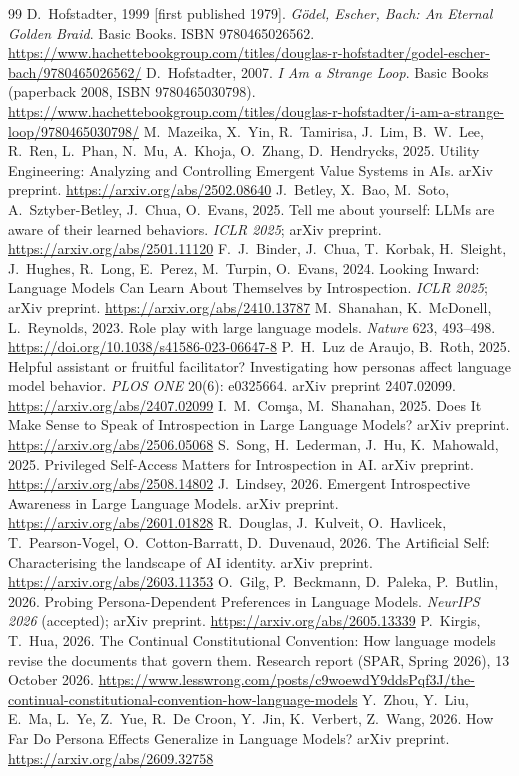\documentclass[11pt]{article}
\begin{document}
\begin{thebibliography}{99}\small
{} D.~Hofstadter, 1999 [first published 1979]. \emph{G\"odel,
Escher, Bach: An Eternal Golden Braid}. Basic Books. ISBN 9780465026562.
\url{https://www.hachettebookgroup.com/titles/douglas-r-hofstadter/godel-escher-bach/9780465026562/}
 D.~Hofstadter, 2007. \emph{I Am a Strange Loop}.
Basic Books (paperback 2008, ISBN 9780465030798).
\url{https://www.hachettebookgroup.com/titles/douglas-r-hofstadter/i-am-a-strange-loop/9780465030798/}
 M.~Mazeika, X.~Yin, R.~Tamirisa, J.~Lim, B.~W.~Lee, R.~Ren,
L.~Phan, N.~Mu, A.~Khoja, O.~Zhang, D.~Hendrycks, 2025. Utility Engineering:
Analyzing and Controlling Emergent Value Systems in AIs. arXiv preprint.
\url{https://arxiv.org/abs/2502.08640}
 J.~Betley, X.~Bao, M.~Soto, A.~Sztyber-Betley, J.~Chua,
O.~Evans, 2025. Tell me about yourself: LLMs are aware of their learned
behaviors. \emph{ICLR 2025}; arXiv preprint. \url{https://arxiv.org/abs/2501.11120}
 F.~J.~Binder, J.~Chua, T.~Korbak, H.~Sleight, J.~Hughes,
R.~Long, E.~Perez, M.~Turpin, O.~Evans, 2024. Looking Inward: Language Models
Can Learn About Themselves by Introspection. \emph{ICLR 2025}; arXiv
preprint.
\url{https://arxiv.org/abs/2410.13787}
 M.~Shanahan, K.~McDonell, L.~Reynolds, 2023. Role play with
large language models. \emph{Nature} 623, 493--498.
\url{https://doi.org/10.1038/s41586-023-06647-8}
 P.~H.~Luz de Araujo, B.~Roth, 2025. Helpful assistant
or fruitful facilitator? Investigating how personas affect language model
behavior. \emph{PLOS ONE} 20(6): e0325664. arXiv preprint 2407.02099.
\url{https://arxiv.org/abs/2407.02099}
 I.~M.~Com\c{s}a, M.~Shanahan, 2025. Does It Make Sense to
Speak of Introspection in Large Language Models? arXiv preprint.
\url{https://arxiv.org/abs/2506.05068}
 S.~Song, H.~Lederman, J.~Hu, K.~Mahowald, 2025. Privileged
Self-Access Matters for Introspection in AI. arXiv preprint.
\url{https://arxiv.org/abs/2508.14802}
 J.~Lindsey, 2026. Emergent Introspective Awareness in
Large Language Models. arXiv preprint. \url{https://arxiv.org/abs/2601.01828}
 R.~Douglas, J.~Kulveit, O.~Havlicek, T.~Pearson-Vogel,
O.~Cotton-Barratt, D.~Duvenaud, 2026. The Artificial Self: Characterising
the landscape of AI identity. arXiv preprint.
\url{https://arxiv.org/abs/2603.11353}
 O.~Gilg, P.~Beckmann, D.~Paleka, P.~Butlin, 2026. Probing
Persona-Dependent Preferences in Language Models. \emph{NeurIPS 2026}
(accepted); arXiv preprint. \url{https://arxiv.org/abs/2605.13339}
 P.~Kirgis, T.~Hua, 2026. The Continual Constitutional
Convention: How language models revise the documents that govern them.
Research report (SPAR, Spring 2026), 13 October 2026.
\url{https://www.lesswrong.com/posts/c9woewdY9ddsPqf3J/the-continual-constitutional-convention-how-language-models}
 Y.~Zhou, Y.~Liu, E.~Ma, L.~Ye, Z.~Yue, R.~De Croon,
Y.~Jin, K.~Verbert, Z.~Wang, 2026. How Far Do Persona Effects Generalize in
Language Models? arXiv preprint. \url{https://arxiv.org/abs/2609.32758}
\end{thebibliography}
\end{document}
